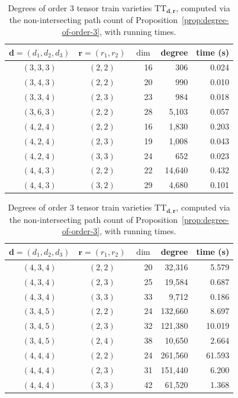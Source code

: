 \documentclass[12pt]{article}
\theoremstyle{definition}
\numberwithin{theorem}{section}
\begin{document}
\begin{table}[h!]
\centering
\scriptsize
\begin{minipage}[t]{0.48\textwidth}
\centering
\begin{tabular}{@{}ccrrr@{}}
\toprule
$\mathbf{d}=(d_1,d_2,d_3)$ & $\mathbf{r}=(r_1,r_2)$ & $\dim$ & degree & time (s) \\
\midrule
$(3,3,3)$ & $(2,2)$ & 16 & 306       & 0.024 \\
$(3,4,3)$ & $(2,2)$ & 20 & 990       & 0.010 \\
$(3,3,4)$ & $(2,3)$ & 23 & 984       & 0.018 \\
$(3,6,3)$ & $(2,2)$ & 28 & 5{,}103   & 0.057 \\
$(4,2,4)$ & $(2,2)$ & 16 & 1{,}830   & 0.203 \\
$(4,2,4)$ & $(2,3)$ & 19 & 1{,}008   & 0.043 \\
$(4,2,4)$ & $(3,3)$ & 24 & 652       & 0.023 \\
$(4,4,3)$ & $(2,2)$ & 22 & 14{,}640  & 0.432 \\
$(4,4,3)$ & $(3,2)$ & 29 & 4{,}680   & 0.101 \\
\bottomrule
\end{tabular}
\end{minipage}
\hfill
\begin{minipage}[t]{0.48\textwidth}
\centering
\begin{tabular}{@{}ccrrr@{}}
\toprule
$\mathbf{d}=(d_1,d_2,d_3)$ & $\mathbf{r}=(r_1,r_2)$ & $\dim$ & degree & time (s) \\
\midrule
$(4,3,4)$ & $(2,2)$ & 20 & 32{,}316  & 5.579 \\
$(4,3,4)$ & $(2,3)$ & 25 & 19{,}584  & 0.687 \\
$(4,3,4)$ & $(3,3)$ & 33 & 9{,}712   & 0.186 \\
$(3,4,5)$ & $(2,2)$ & 24 & 132{,}660 & 8.697 \\
$(3,4,5)$ & $(2,3)$ & 32 & 121{,}380 & 10.019 \\
$(3,4,5)$ & $(2,4)$ & 38 & 10{,}650  & 2.664 \\
$(4,4,4)$ & $(2,2)$ & 24 & 261{,}560 & 61.593 \\
$(4,4,4)$ & $(2,3)$ & 31 & 151{,}440 & 6.200 \\
$(4,4,4)$ & $(3,3)$ & 42 & 61{,}520  & 1.368 \\
\bottomrule
\end{tabular}
\end{minipage}
\caption{Degrees of order 3 tensor train varieties $\mathrm{TT}_{\mathbf{d},\mathbf{r}}$, computed via the non-intersecting path count of Proposition~\ref{prop:degree-of-order-3}, with running times.}
\label{tab:tt-degrees}
\end{table}
\end{document}
